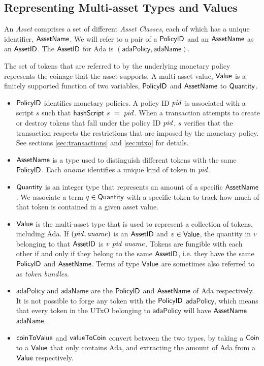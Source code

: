 \subsection*{Representing Multi-asset Types and Values}
An \emph{Asset} comprises a set of different \emph{Asset Classes}, each of which has
a unique identifier, $\mathsf{AssetName}$. We will refer to a pair of a $\mathsf{PolicyID}$ and an
$\mathsf{AssetName}$ as an $\mathsf{AssetID}$. The $\mathsf{AssetID}$ for Ada is $(\mathsf{adaPolicy}, \mathsf{adaName})$.

The set of tokens that are referred to by the underlying monetary
policy represents the coinage that the asset supports. A multi-asset
value, $\mathsf{Value}$ is a finitely supported function of two variables,
$\mathsf{PolicyID}$ and $\mathsf{AssetName}$ to $\mathsf{Quantity}$.

\begin{itemize}
  \item $\mathsf{PolicyID}$ identifies monetary policies. A policy ID $\mathit{pid}$ is associated with a script
    $s$ such that $\mathsf{hashScript}~s~=~pid$. When a transaction attempts to create or destroy tokens
    that fall under the policy ID $\mathit{pid}$,
    $s$ verifies that the transaction
    respects the restrictions that are imposed by the monetary policy.
    See sections \ref{sec:transactions} and \ref{sec:utxo} for details.

  \item $\mathsf{AssetName}$ is a type used to distinguish different tokens with the same $\mathsf{PolicyID}$.
    Each $aname$ identifies a unique kind of token in $\mathit{pid}$.

  \item $\mathsf{Quantity}$ is an integer type that represents an amount of a specific $\mathsf{AssetName}$. We associate
    a term $q\in\mathsf{Quantity}$ with a specific token to track how much of that token is contained in a given asset value.

  \item $\mathsf{Value}$ is the multi-asset type that is used to represent
    a collection of tokens, including Ada. If $(\mathit{pid}, \mathit{aname})$ is an $\mathsf{AssetID}$ and $v \in \mathsf{Value}$,
    the quantity in $v$ belonging to that $\mathsf{AssetID}$ is $v~\mathit{pid}~\mathit{aname}$.
    Tokens are fungible with each other if and only if they belong to the same $\mathsf{AssetID}$,
    i.e. they have the same $\mathsf{PolicyID}$ and $\mathsf{AssetName}$. Terms of type $\mathsf{Value}$ are sometimes also referred to as
    \emph{token bundles}.

  \item $\mathsf{adaPolicy}$ and $\mathsf{adaName}$ are the $\mathsf{PolicyID}$ and $\mathsf{AssetName}$ of Ada respectively.
    It is not possible to forge any token with the $\mathsf{PolicyID}$ $\mathsf{adaPolicy}$, which means that every
    token in the UTxO belonging to $\mathsf{adaPolicy}$ will have $\mathsf{AssetName}$ $\mathsf{adaName}$.

  \item $\mathsf{coinToValue}$ and $\mathsf{valueToCoin}$ convert between the two types,
  by taking a $\mathsf{Coin}$ to a $\mathsf{Value}$ that only contains Ada, and extracting the amount of Ada from a $\mathsf{Value}$ respectively.
\end{itemize}

